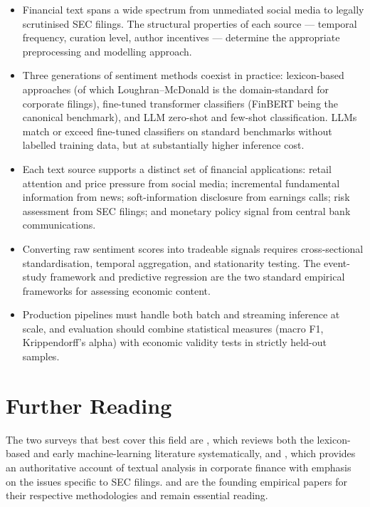 \begin{itemize}
  \item Financial text spans a wide spectrum from unmediated social media to legally scrutinised SEC filings. The structural properties of each source --- temporal frequency, curation level, author incentives --- determine the appropriate preprocessing and modelling approach.

  \item Three generations of sentiment methods coexist in practice: lexicon-based approaches (of which Loughran--McDonald is the domain-standard for corporate filings), fine-tuned transformer classifiers (FinBERT being the canonical benchmark), and LLM zero-shot and few-shot classification. LLMs match or exceed fine-tuned classifiers on standard benchmarks without labelled training data, but at substantially higher inference cost.

  \item Each text source supports a distinct set of financial applications: retail attention and price pressure from social media; incremental fundamental information from news; soft-information disclosure from earnings calls; risk assessment from SEC filings; and monetary policy signal from central bank communications.

  \item Converting raw sentiment scores into tradeable signals requires cross-sectional standardisation, temporal aggregation, and stationarity testing. The event-study framework and predictive regression are the two standard empirical frameworks for assessing economic content.

  \item Production pipelines must handle both batch and streaming inference at scale, and evaluation should combine statistical measures (macro F1, Krippendorff's alpha) with economic validity tests in strictly held-out samples.
\end{itemize}

\section{Further Reading}
\label{sec:ch09-further-reading}

The two surveys that best cover this field are \citet{kearney2014textual}, which reviews both the lexicon-based and early machine-learning literature systematically, and \citet{loughran2020textual}, which provides an authoritative account of textual analysis in corporate finance with emphasis on the issues specific to SEC filings. \citet{tetlock2007giving} and \citet{loughran2011liability} are the founding empirical papers for their respective methodologies and remain essential reading.


